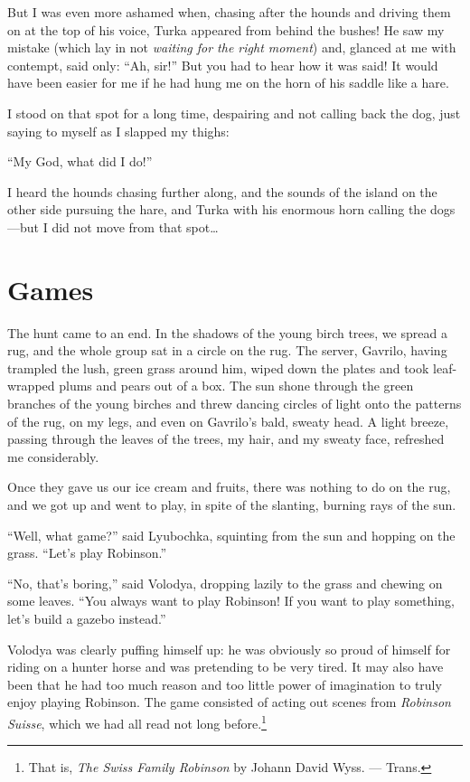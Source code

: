 But I was even more ashamed when, chasing after the hounds and driving them on at the top of his voice, Turka appeared from behind the bushes! He saw my mistake (which lay in not \emph{waiting for the right moment}) and, glanced at me with contempt, said only: ``Ah, sir!'' But you had to hear how it was said! It would have been easier for me if he had hung me on the horn of his saddle like a hare.

I stood on that spot for a long time, despairing and not calling back the dog, just saying to myself as I slapped my thighs:

``My God, what did I do!'' %

I heard the hounds chasing further along, and the sounds of the island on the other side pursuing the hare, and Turka with his enormous horn calling the dogs---but I did not move from that spot\ldots{}

\chapter{Games} %

The hunt came to an end. In the shadows of the young birch trees, we spread a rug, and the whole group sat in a circle on the rug. The server, Gavrilo, having trampled the lush, green grass around him, wiped down the plates and took leaf-wrapped plums and pears out of a box. The sun shone through the green branches of the young birches and threw dancing circles of light onto the patterns of the rug, on my legs, and even on Gavrilo's bald, sweaty head. A light breeze, passing through the leaves of the trees, my hair, and my sweaty face, refreshed me considerably.

Once they gave us our ice cream and fruits, there was nothing to do on the rug, and we got up and went to play, in spite of the slanting, burning rays of the sun.

``Well, what game?'' said Lyubochka, squinting from the sun and hopping on the grass. ``Let's play Robinson.'' %

``No, that's boring,'' said Volodya, dropping lazily to the grass and chewing on some leaves. ``You always want to play Robinson! If you want to play something, let's build a gazebo instead.'' %

Volodya was clearly puffing himself up: he was obviously so proud of himself for riding on a hunter horse and was pretending to be very tired. It may also have been that he had too much reason and too little power of imagination to truly enjoy playing Robinson. The game consisted of acting out scenes from \textit{Robinson Suisse}, which we had all read not long before.\footnote{That is, \textit{The Swiss Family Robinson} by Johann David Wyss. --- Trans.}

